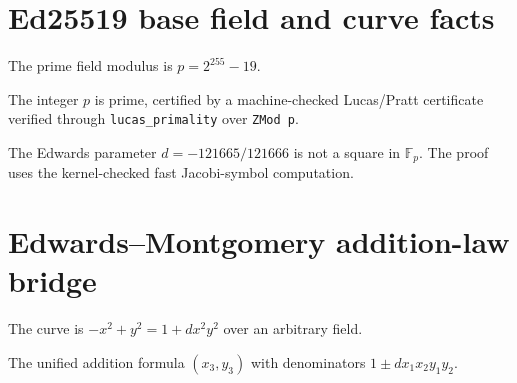 
\section{Ed25519 base field and curve facts}

\begin{definition}
  \label{def:ed25519P}
  \leanok
  The prime field modulus is $p = 2^{255} - 19$.
\end{definition}

\begin{lemma}[Primality of $2^{255} - 19$]
  \label{lem:ed25519P_prime}
  \leanok
  The integer $p$ is prime, certified by a machine-checked Lucas/Pratt
  certificate verified through \texttt{lucas\_primality} over \texttt{ZMod p}.
\end{lemma}

\begin{lemma}
  \label{lem:ed25519D_not_isSquare}
  \leanok
  The Edwards parameter $d = -121665/121666$ is not a square in $\mathbb{F}_p$.
  The proof uses the kernel-checked fast Jacobi-symbol computation.
\end{lemma}

\section{Edwards--Montgomery addition-law bridge}

\begin{definition}
  \label{def:edwardsEq}
  \leanok
  The curve is $-x^2 + y^2 = 1 + d x^2 y^2$ over an arbitrary field.
\end{definition}

\begin{definition}
  \label{def:edAddField}
  \leanok
  The unified addition formula $(x_3, y_3)$ with denominators
  $1 \pm d x_1 x_2 y_1 y_2$.
\end{definition}

